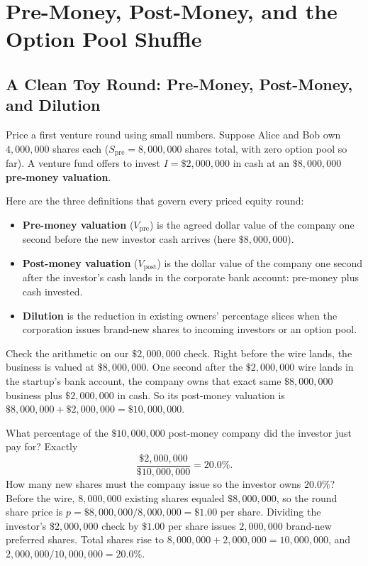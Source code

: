 \section{Pre-Money, Post-Money, and the Option Pool Shuffle}
\label{sec:pre-post-money}

\subsection{A Clean Toy Round: Pre-Money, Post-Money, and Dilution}

Price a first venture round using small numbers. Suppose Alice and Bob own $4{,}000{,}000$ shares each ($S_{\text{pre}} = 8{,}000{,}000$ shares total, with zero option pool so far). A venture fund offers to invest $I = \$2{,}000{,}000$ in cash at an $\$8{,}000{,}000$ \textbf{pre-money valuation}.

Here are the three definitions that govern every priced equity round:
\begin{itemize}
  \item \textbf{Pre-money valuation} ($V_{\text{pre}}$) is the agreed dollar value of the company one second before the new investor cash arrives (here $\$8{,}000{,}000$).
  \item \textbf{Post-money valuation} ($V_{\text{post}}$) is the dollar value of the company one second after the investor's cash lands in the corporate bank account: pre-money plus cash invested.
  \item \textbf{Dilution} is the reduction in existing owners' percentage slices when the corporation issues brand-new shares to incoming investors or an option pool.
\end{itemize}

Check the arithmetic on our $\$2{,}000{,}000$ check. Right before the wire lands, the business is valued at $\$8{,}000{,}000$. One second after the $\$2{,}000{,}000$ wire lands in the startup's bank account, the company owns that exact same $\$8{,}000{,}000$ business plus $\$2{,}000{,}000$ in cash. So its post-money valuation is $\$8{,}000{,}000 + \$2{,}000{,}000 = \$10{,}000{,}000$.

What percentage of the $\$10{,}000{,}000$ post-money company did the investor just pay for? Exactly
\[
  \frac{\$2{,}000{,}000}{\$10{,}000{,}000} = 20.0\%.
\]
How many new shares must the company issue so the investor owns $20.0\%$? Before the wire, $8{,}000{,}000$ existing shares equaled $\$8{,}000{,}000$, so the round share price is $p = \$8{,}000{,}000 / 8{,}000{,}000 = \$1.00$ per share. Dividing the investor's $\$2{,}000{,}000$ check by $\$1.00$ per share issues $2{,}000{,}000$ brand-new preferred shares. Total shares rise to $8{,}000{,}000 + 2{,}000{,}000 = 10{,}000{,}000$, and $2{,}000{,}000 / 10{,}000{,}000 = 20.0\%$.

